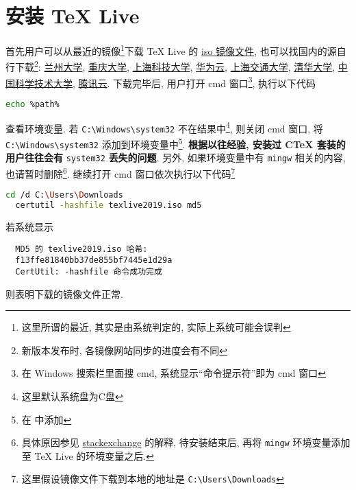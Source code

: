 \documentclass{ctexrep}
\begin{document}
\section{安装 \TeX{} Live}
首先用户可以从最近的镜像\footnote{这里所谓的最近, 其实是由系统判定的, 实际上系统可能会误判}下载 \TeX{} Live 的 \href{http://mirrors.ctan.org/systems/texlive/Images/texlive2019.iso}{iso 镜像文件},
也可以找国内的源自行下载\footnote{新版本发布时, 各镜像网站同步的进度会有不同}: \href{http://mirror.lzu.edu.cn/CTAN/systems/texlive/Images/texlive2019.iso}{兰州大学},
\href{http://mirrors.cqu.edu.cn/CTAN/systems/texlive/Images/texlive2019.iso}{重庆大学},
\href{http://mirrors-wan.geekpie.club/CTAN/systems/texlive/Images/texlive2019.iso}{上海科技大学},
\href{http://mirrors.huaweicloud.com/repository/toolkit/CTAN/systems/texlive/Images/texlive2019.iso}{华为云},
\href{http://mirrors.sjtug.sjtu.edu.cn/ctan/systems/texlive/Images/texlive2019.iso}{上海交通大学},
\href{http://mirrors.tuna.tsinghua.edu.cn/CTAN/systems/texlive/Images/texlive2019.iso}{清华大学},
\href{http://mirrors.ustc.edu.cn/CTAN/systems/texlive/Images/texlive2019.iso}{中国科学技术大学},
\href{https://mirrors.cloud.tencent.com/CTAN/systems/texlive/Images/texlive2019.iso}{腾讯云}.
下载完毕后, 用户打开 \textsf{cmd} 窗口\footnote{在 Windows 搜索栏里面搜 cmd, 系统显示“命令提示符”即为 \textsf{cmd} 窗口}, 执行以下代码
\begin{lstlisting}[language = bash]
  echo %path%
\end{lstlisting}
查看环境变量. 
若 \texttt{C:\textbackslash Windows\textbackslash system32} 不在结果中\footnote{这里默认系统盘为\textsf{C}盘}, 则关闭 \textsf{cmd} 窗口, 将 \texttt{C:\textbackslash Windows\textbackslash system32} 添加到环境变量中\footnote{在  中添加}.
\textbf{根据以往经验, 安装过 C\TeX{} 套装的用户往往会有} \texttt{system32} \textbf{丢失的问题}. 
另外, 如果环境变量中有 \texttt{mingw} 相关的内容, 也请暂时删除\footnote{具体原因参见 \href{https://tex.stackexchange.com/questions/445086/error-installing-latest-version-of-tex-live-on-windows-10}{stackexchange} 的解释, 待安装结束后, 再将 \texttt{mingw} 环境变量添加至 \TeX{} Live 的环境变量之后.}.
继续打开 \textsf{cmd} 窗口依次执行以下代码\footnote{这里假设镜像文件下载到本地的地址是 \texttt{C:\textbackslash Users\textbackslash Downloads}}
\begin{lstlisting}[language = bash]
  cd /d C:\Users\Downloads
  certutil -hashfile texlive2019.iso md5
\end{lstlisting}
若系统显示
\begin{lstlisting}
  MD5 的 texlive2019.iso 哈希:
  f13ffe81840bb37de855bf7445e1d29a
  CertUtil: -hashfile 命令成功完成
\end{lstlisting}
则表明下载的镜像文件正常.
\end{document}
